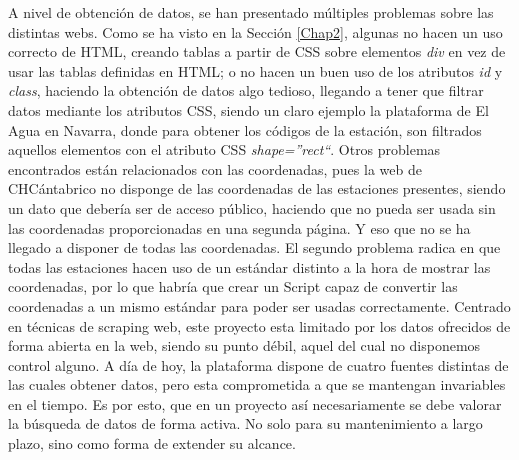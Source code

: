 \newline
A nivel de obtención de datos, se han presentado múltiples problemas sobre las distintas webs. Como se ha visto en la Sección \ref{Chap2}, algunas no hacen un uso correcto de HTML, creando tablas a partir de CSS sobre elementos \textit{div} en vez de usar las tablas definidas en HTML; o no hacen un buen uso de los atributos \textit{id} y \textit{class}, haciendo la obtención de datos algo tedioso, llegando a tener que filtrar datos mediante los atributos CSS, siendo un claro ejemplo la plataforma de El Agua en Navarra, donde para obtener los códigos de la estación, son filtrados aquellos elementos con el atributo CSS \textit{shape=''rect``}.\newline
\newline
Otros problemas encontrados están relacionados con las coordenadas, pues la web de CHCántabrico no disponge de las coordenadas de las estaciones presentes, siendo un dato que debería ser de acceso público, haciendo que no pueda ser usada sin las coordenadas proporcionadas en una segunda página. Y eso que no se ha llegado a disponer de todas las coordenadas. El segundo problema radica en que todas las estaciones hacen uso de un estándar distinto a la hora de mostrar las coordenadas, por lo que habría que crear un Script capaz de convertir las coordenadas a un mismo estándar para poder ser usadas correctamente.\newline
\newline
Centrado en técnicas de scraping web, este proyecto esta limitado por los datos ofrecidos de forma abierta en la web, siendo su punto débil, aquel del cual no disponemos control alguno. A día de hoy, la plataforma dispone de cuatro fuentes distintas de las cuales obtener datos, pero esta comprometida a que se mantengan invariables en el tiempo. Es por esto, que en un proyecto así necesariamente se debe valorar la búsqueda de datos de forma activa. No solo para su mantenimiento a largo plazo, sino como forma de extender su alcance.\newline
\newline